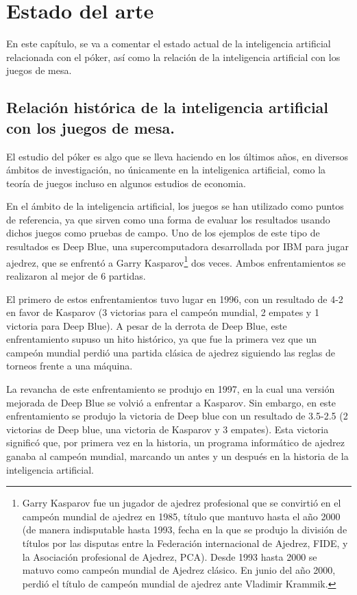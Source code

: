 \chapter{Estado del arte}

En este capítulo, se va a comentar el estado actual de la inteligencia artificial relacionada con el póker, así como la relación de la inteligencia artificial con los juegos de mesa.


\section{Relación histórica de la inteligencia artificial con los juegos de mesa.}

El estudio del póker es algo que se lleva haciendo en los últimos años, en diversos ámbitos de investigación, no únicamente en la inteligenica artificial, como la teoría de juegos incluso en algunos estudios de economia. \cite{Billings} 

En el ámbito de la inteligencia artificial, los juegos se han utilizado como puntos de referencia, ya que sirven como una forma de evaluar los resultados usando dichos juegos como pruebas de campo.
 Uno de los ejemplos de este tipo de resultados es Deep Blue\cite{deepblue1}, una supercomputadora desarrollada por IBM para jugar ajedrez, que se enfrentó a Garry Kasparov\footnote{Garry Kasparov fue un jugador de ajedrez profesional que se convirtió en el campeón mundial de ajedrez en 1985, título que mantuvo hasta el año 2000 (de manera indisputable hasta 1993, fecha en la que se produjo la división de títulos por las disputas entre la Federación internacional de Ajedrez, FIDE, y la Asociación profesional de Ajedrez, PCA). Desde 1993 hasta 2000 se matuvo como campeón mundial de Ajedrez clásico. En junio del año 2000, perdió el título de campeón mundial de ajedrez ante Vladimir Krammik. } dos veces. Ambos enfrentamientos se realizaron al mejor de 6 partidas. 

El primero de estos enfrentamientos tuvo lugar en 1996, con un resultado de 4-2 en favor de Kasparov (3 victorias para el campeón mundial, 2 empates y 1 victoria para Deep Blue). A pesar de la derrota de Deep Blue, este enfrentamiento supuso un hito histórico, ya que fue la primera vez que un campeón mundial perdió una partida clásica de ajedrez siguiendo las reglas de torneos frente a una máquina.

La revancha de este enfrentamiento se produjo en 1997, en la cual una versión mejorada de Deep Blue se volvió a enfrentar a Kasparov. Sin embargo, en este enfrentamiento se produjo la victoria de Deep blue con un resultado de 3.5-2.5 (2 victorias de Deep blue, una victoria de Kasparov y 3 empates). Esta victoria significó que, por primera vez en la historia, un programa informático de ajedrez ganaba al campeón mundial, marcando un antes y un después en la historia de la inteligencia artificial.\cite{deepblue1}

